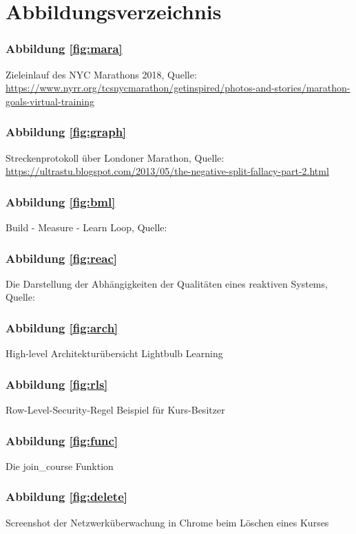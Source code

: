 \chapter*{Abbildungsverzeichnis}

\subsection*{Abbildung \ref{fig:mara}}
Zieleinlauf des NYC Marathons 2018, Quelle: \url{https://www.nyrr.org/tcsnycmarathon/getinspired/photos-and-stories/marathon-goals-virtual-training}

\subsection*{Abbildung \ref{fig:graph}}
Streckenprotokoll über Londoner Marathon, Quelle: \url{https://ultrastu.blogspot.com/2013/05/the-negative-split-fallacy-part-2.html}

\subsection*{Abbildung \ref{fig:bml}}
Build - Measure - Learn Loop, Quelle: \cite[S. 81]{ries2011lean}

\subsection*{Abbildung \ref{fig:reac}}
Die Darstellung der Abhängigkeiten der Qualitäten eines reaktiven Systems, Quelle: \cite{ReactiveManifesto}

\subsection*{Abbildung \ref{fig:arch}}
High-level Architekturübersicht Lightbulb Learning

\subsection*{Abbildung \ref{fig:rls}}
Row-Level-Security-Regel Beispiel für Kurs-Besitzer

\subsection*{Abbildung \ref{fig:func}}
Die join\_course Funktion

\subsection*{Abbildung \ref{fig:delete}}
Screenshot der Netzwerküberwachung in Chrome beim Löschen eines Kurses

